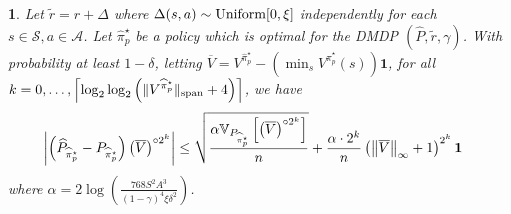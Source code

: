 \documentclass{article}
\theoremstyle{plain}
\theoremstyle{plain}
\newtheorem{lem}[thm]{\protect\lemmaname}
\theoremstyle{remark}
\theoremstyle{plain}
\theoremstyle{plain}
\providecommand{\lemmaname}{Lemma}
\newcommand{\Var}{\mathbb{V}}
\newcommand{\Phat}{\widehat{P}}
\newcommand{\one}{\mathbf{1}}
\newcommand{\pihat}{\widehat{\pi}}
\newcommand{\Vc}{\overline{V}}
\newcommand{\A}{\mathcal{A}}
\renewcommand{\S}{\mathcal{S}}
\newcommand{\pihatpert}{\pihat^\star_p}
\begin{document}
\begin{lem}
\label{lem:LOO_DMDP_bernstein_bound_pert}
    Let $\widetilde{r} = r + \Delta$ where $\Delta(s,a) \sim \textnormal{Uniform}[0, \xi]$ independently for each $s \in \S, a \in \A$. Let $\pihatpert$ be a policy which is optimal for the DMDP $(\Phat, \widetilde{r}, \gamma)$. With probability at least $1 - \delta$, letting $\Vc = V^{\pihatpert} - \left(\min_s V^{\pihatpert}(s)\right)\one$, for all $k = 0, \dots, \left\lceil\log_2 \log_2 \left( \spannorm{V^{\pihatpert}} + 4\right) \right\rceil$, we have
    \begin{align*}
        \left| \left(\Phat_{\pihatpert} - P_{\pihatpert}\right) \left( \Vc \right)^{\circ 2^k} \right|
    &\leq \sqrt{\frac{\alpha   \Var_{P_{\pihatpert}} \left[ \left(\Vc \right)^{\circ 2^k}  \right]    }{n }} + \frac{ \alpha \cdot 2^k }{n}  \left( \infnorm{\Vc} + 1\right)^{2^k}   \one
    \end{align*}
where $\alpha = 2 \log \left(\frac{768 S^2A^3}{(1-\gamma)^4 \xi \delta^2} \right)$.
\end{lem}
\end{document}
